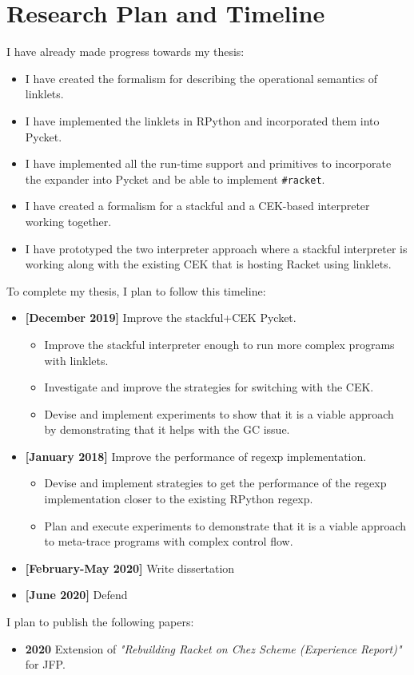 \section{Research Plan and Timeline}
\label{sec:timeline}

I have already made progress towards my thesis:

\begin{itemize}
\item I have created the formalism for describing the operational
  semantics of linklets.
\item I have implemented the linklets in RPython and incorporated them into
  Pycket.
\item I have implemented all the run-time support and primitives to
  incorporate the expander into Pycket and be able to implement
  \texttt{\#racket}.
\item I have created a formalism for a stackful and a CEK-based
  interpreter working together.
\item I have prototyped the two interpreter approach where a stackful
  interpreter is working along with the existing CEK that is hosting
  Racket using linklets.
\end{itemize}

To complete my thesis, I plan to follow this timeline:

\begin{itemize}
  \item \textbf{[December 2019]} Improve the stackful+CEK Pycket.
    \begin{itemize}
    \item Improve the stackful interpreter enough to run more complex
      programs with linklets.
     \item Investigate and improve the strategies for switching with
       the CEK.
     \item Devise and implement experiments to show that it is a
       viable approach by demonstrating that it helps with the GC
       issue.
    \end{itemize}
  \item \textbf{[January 2018]} Improve the performance of regexp
    implementation.
    \begin{itemize}
      \item Devise and implement strategies to get the performance of
        the regexp implementation closer to the existing RPython
        regexp.
      \item Plan and execute experiments to demonstrate that it is a
        viable approach to meta-trace programs with complex control
        flow.
    \end{itemize}
  \item \textbf{[February-May 2020]} Write dissertation
  \item \textbf{[June 2020]} Defend
\end{itemize}


I plan to publish the following papers:

\begin{itemize}
\item \textbf{2020} Extension of \emph{"Rebuilding Racket on Chez
  Scheme (Experience Report)"} \cite{racket-on-chez-19} for JFP.
\end{itemize}
